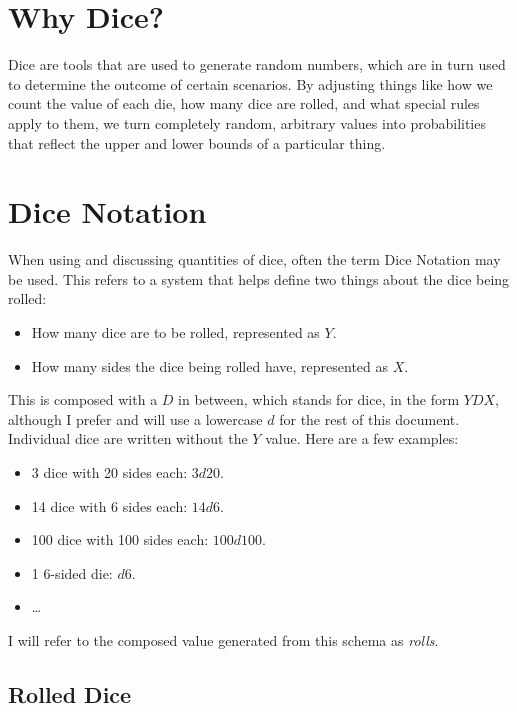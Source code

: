 \documentclass[../main.tex]{subfiles}
\begin{document}
    \section{Why Dice?}

    Dice are tools that are used to generate random numbers, which are in turn used to determine the outcome of certain scenarios. By adjusting things like how we count the value of each die, how many dice are rolled, and what special rules apply to them, we turn completely random, arbitrary values into probabilities that reflect the upper and lower bounds of a particular thing.

    \section{Dice Notation}

    When using and discussing quantities of dice, often the term Dice Notation may be used. This refers to a system that helps define two things about the dice being rolled:

    \begin{itemize}
        \item How many dice are to be rolled, represented as $Y$.
        \item How many sides the dice being rolled have, represented as $X$.
    \end{itemize}

    This is composed with a $D$ in between, which stands for dice, in the form $YDX$, although I prefer and will use a lowercase $d$ for the rest of this document. Individual dice are written without the $Y$ value. Here are a few examples:

    \begin{itemize}
        \item 3 dice with 20 sides each: $3d20$.
        \item 14 dice with 6 sides each: $14d6$.
        \item 100 dice with 100 sides each: $100d100$.
        \item 1 6-sided die: $d6$.
        \item \dots
    \end{itemize}

    I will refer to the composed value generated from this schema as {\em rolls}.

    \subsection{Rolled Dice}
\end{document}
